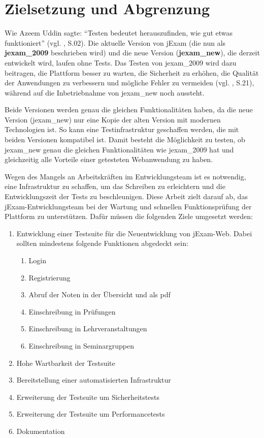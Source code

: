 
\section{Zielsetzung und Abgrenzung}


Wie Azeem Uddin  sagte: ``Testen bedeutet herauszufinden, wie gut etwas funktioniert'' (vgl. \cite{anand12importance}, S.02).
Die aktuelle Version von jExam (die nun als \textbf{\gls{jexam_2009}} beschrieben wird) und die neue Version (\textbf{\gls{jexam_new}}),
die derzeit entwickelt wird, laufen ohne Tests. Das Testen von \gls{jexam_2009} wird dazu beitragen, die Plattform
besser zu warten, die Sicherheit zu erhöhen, die Qualität der Anwendungen zu verbessern und mögliche Fehler zu
vermeiden (vgl. \cite{shultz2011software}, S.21), während auf die Inbetriebnahme von \gls{jexam_new} noch aussteht.


Beide Versionen werden genau die gleichen Funktionalitäten haben, da die neue Version (\gls{jexam_new}) nur eine Kopie der
alten Version mit modernen Technologien ist. So kann eine Testinfrastruktur geschaffen werden, die mit beiden Versionen
kompatibel ist. Damit besteht die Möglichkeit zu testen, ob \gls{jexam_new} genau die gleichen Funktionalit\"aten wie
\gls{jexam_2009} hat und gleichzeitig alle Vorteile einer
getesteten Webanwendung zu haben.

Wegen des Mangels an Arbeitskräften im Entwicklungsteam ist es notwendig,
eine Infrastruktur zu schaffen, um das Schreiben zu erleichtern und die
Entwicklungszeit der Tests zu beschleunigen. Diese Arbeit zielt darauf ab,
das jExam-Entwicklungsteam bei der Wartung und schnellen Funktionsprüfung der
Plattform zu unterstützen. Dafür müssen die folgenden Ziele umgesetzt werden:


\begin{enumerate}
    \item Entwicklung einer Testsuite für die Neuentwicklung von jExam-Web.
    Dabei sollten mindestens folgende Funktionen abgedeckt sein:
    \begin{enumerate}
        \item Login
        \item Registrierung
        \item Abruf der Noten in der \"Ubersicht und als pdf
        \item Einschreibung in Pr\"ufungen
        \item Einschreibung in Lehrveranstaltungen
        \item Einschreibung in Seminargruppen
    \end{enumerate}
    \item Hohe Wartbarkeit der Testsuite
    \item Bereitstellung einer automatisierten Infrastruktur
    \item Erweiterung der Testsuite um Sicherheitstests
    \item Erweiterung der Testsuite um Performancetests
    \item Dokumentation
\end{enumerate}